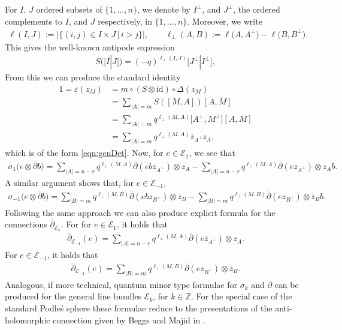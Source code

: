 \documentclass[pdftex]{sigma}
\numberwithin{equation}{section}
\newcommand{\e}{\varepsilon}
\newcommand\del{\partial}
\newcommand\adel{\overline{\partial}}
\begin{document}
For $I$, $J$ ordered subsets of $\{1,\dots ,n\}$, we denote by $I^{\perp}$, and $J^{\perp}$, the ordered complements to $I$, and $J$ respectively, in $\{1,\dots, n\}$. Moreover, we write
\begin{gather*}
\ell(I,J):= |\{(i,j)\in I\times J \,| \, i>j\}|, \qquad \ell_{\perp}(A,B) := \ell\big(A,A^{\perp}\big) - \ell\big(B,B^{\perp}\big).
\end{gather*}
This gives the well-known antipode expression
\begin{gather*}
S([I|J]) = (-q)^{\ell_{\perp}(I,J)}\big[{J^\perp}|{I^\perp}\big],
\end{gather*}
From this we can produce the standard identity
\begin{align*}
1 = \e(z_M) &= m \circ (S \otimes \mathrm{id}) \circ \Delta(z_M)\\
& = \sum_{|A| = m} S([M,A])[A,M]\\
& = \sum_{|A| = m} q^{\ell_{\perp}(M,A)} \big[A^{\perp},M^{\perp}\big][A,M]\\
& = \sum_{|A| = m} q^{\ell_{\perp}(M,A)} \overline{z}_{A^{\perp}}z_A,
\end{align*}
which is of the form \eqref{eqn:genDet}. Now, for $e \in \mathcal{E}_1$, we see that
\begin{gather*}
\sigma_1\big(e \otimes \adel b\big) = \sum_{|A|=n-r} q^{\ell_{\perp}(M,A)} \adel(eb\overline{z}_{A^{\perp}}) \otimes z_A- \sum_{|A|=n-r} q^{\ell_{\perp}(M,A)} \adel(e\overline{z}_{A^{\perp}}) \otimes z_Ab.
\end{gather*}
A similar argument shows that, for $e \in \mathcal{E}_{-1}$,
\begin{gather*}
\sigma_{-1}\big(e \otimes \adel b\big) = \sum_{|B|=m} q^{\ell_{\perp}(M,B)} \adel(ebz_{B^{\perp}}) \otimes \overline{z}_B - \sum_{|B|=m} q^{\ell_{\perp}(M,B)} \adel(ez_{B^{\perp}}) \otimes \overline{z}_Bb.
\end{gather*}
Following the same approach we can also produce explicit formula for the connections $\adel_{\mathcal{E}_k}$. For for $e \in \mathcal{E}_1$, it holds that
\begin{gather*}
\adel_{\mathcal{E}_{-1}}(e) = \sum_{|A|=n-r} q^{\ell_{\perp}(M,A)} \adel(e\overline{z}_{A^{\perp}}) \otimes z_A.
\end{gather*}
For $e \in \mathcal{E}_{-1}$, it holds that
\begin{gather*}
\adel_{\mathcal{E}_{-1}}(e) = \sum_{|B|=m} q^{\ell_{\perp}(M,B)} \adel(ez_{B^{\perp}}) \otimes \overline{z}_B.
\end{gather*}
Analogous, if more technical, quantum minor type formulae for $\sigma_k$ and $\del$ can be produced for the general line bundles $\mathcal{E}_k$, for $k \in \mathbb{Z}$. For the special case of the standard Podle\'s sphere these formulae reduce to the presentations of the anti-holomorphic connection given by Beggs and Majid in \cite[Example~5.23]{BeggsMajid:Leabh}.
\end{document}
